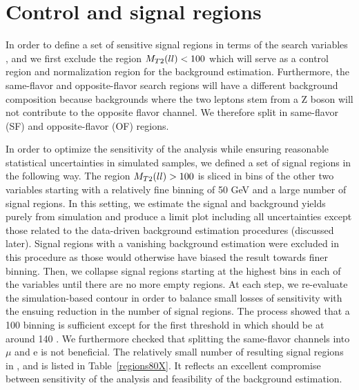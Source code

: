 \section{Control and signal regions}
 
In order to define a set of sensitive signal regions in terms of the search variables \mtll, \mtbb and \mtlblb we first exclude the
region $M_{T2}(ll) < 100$ \GeV which will serve as a control region and normalization region for the \ttbar background estimation.
Furthermore, the same-flavor and opposite-flavor search regions will have a different background composition because backgrounds where the two leptons
stem from a Z boson will not contribute to the opposite flavor channel. We therefore split in same-flavor (SF) and opposite-flavor (OF) regions.
 
In order to optimize the sensitivity of the analysis while ensuring reasonable statistical uncertainties in simulated samples, we defined a set of signal regions in the following way.
The region $M_{T2}(ll) > 100$ \GeV is sliced in bins of the other two variables starting with a relatively fine binning of 50 GeV and a large number of signal regions.
In this setting, we estimate the signal and background yields purely from simulation and produce a limit plot including all uncertainties except those related to the data-driven background estimation procedures (discussed later). Signal regions with a vanishing background estimation were excluded in this procedure as those would otherwise have biased the result towards finer binning.
Then, we collapse signal regions starting at the highest bins in each of the variables until there are no more empty regions. At each step, we re-evaluate the simulation-based contour in order
to balance small losses of sensitivity with the ensuing reduction in the number of signal regions. The process showed that a 100 \GeV binning is sufficient except for the first threshold in \mtll which should be at around 140 \GeV. We furthermore checked that splitting
the same-flavor channels into $\mu$ and e is not beneficial. The relatively small number of resulting signal regions in \mtll, \mtbb and \mtlblb is listed in Table~\ref{regions80X}. It reflects an excellent compromise between sensitivity of the analysis and feasibility of the background estimation.
 
 
